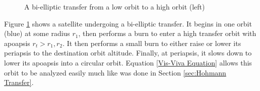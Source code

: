 \documentclass[../basicOrbitalDynamics.tex]{subfiles}
\begin{document}
\begin{figure}[H]
    \centering
    \def\Rone{0.75}
    \def\Rtwo{1.25}
    \def\trAP{4}
    \def\trSMAa{\fpeval{0.5*(\Rone+\trAP)}}
    \def\trSMAb{\fpeval{0.5*(\Rtwo+\trAP)}}
    \def\trEa{\fpeval{(\trAP/\trSMAa) - 1}}
    \def\trEb{\fpeval{(\trAP/\trSMAb) - 1}}
    \def\ctrXa{\fpeval{\Rone-\trSMAa}}
    \def\ctrXb{\fpeval{\Rtwo-\trSMAb}}
    \def\trSmAa{\fpeval{\trSMAa*sqrt(1-(\trEa)^2)}}
    \def\trSmAb{\fpeval{\trSMAb*sqrt(1-(\trEb)^2)}}
    \def\dV{1.25}
    \caption{A bi-elliptic transfer from a low orbit to a high orbit (left)}\label{fig:Bielliptic Transfer}
\end{figure}

Figure \ref{fig:Bielliptic Transfer} shows a satellite undergoing a bi-elliptic transfer. It begins in one orbit (blue) at some radius $r_1$, then performs a burn to enter a high transfer orbit with apoapsis $r_t>r_1,r_2$. It then performs a small burn to either raise or lower its periapsis to the destination orbit altitude. Finally, at periapsis, it slows down to lower its apoapsis into a circular orbit. Equation \eqref{Vis-Viva Equation} allows this orbit to be analyzed easily much like was done in Section \ref{sec:Hohmann Transfer}.
\end{document}
